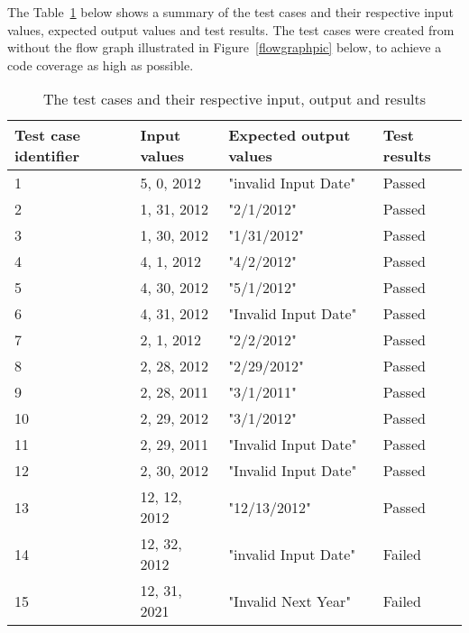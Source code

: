 \noindent The Table~\ref{testinputtable} below shows a summary of the test cases and their respective input values, expected output values and test results. The test cases were created from without the flow graph illustrated in Figure~\ref{flowgraphpic} below, to achieve a code coverage as high as possible.  

\begin{table}[!htb]
	\centering
	\caption{The test cases and their respective input, output and results}
	\label{testinputtable}	
    \begin{tabular}{|l|l|l|l|}
        \hline
        Test case identifier & Input values & Expected output values &  Test results \\ \hline
        1                    & 5, 0, 2012   & "invalid Input Date"   &  Passed       \\ 
        2                    & 1, 31, 2012  & "2/1/2012"             &  Passed       \\ 
        3                    & 1, 30, 2012  & "1/31/2012"            &  Passed       \\ 
        4                    & 4, 1, 2012   & "4/2/2012"             &  Passed       \\ 
        5                    & 4, 30, 2012  & "5/1/2012"             &  Passed       \\ 
        6                    & 4, 31, 2012  & "Invalid Input Date"   &  Passed       \\ 
        7                    & 2, 1, 2012   & "2/2/2012"             &  Passed       \\ 
        8                    & 2, 28, 2012  & "2/29/2012"            &  Passed       \\ 
        9                    & 2, 28, 2011  & "3/1/2011"             &  Passed       \\ 
        10                   & 2, 29, 2012  & "3/1/2012"             &  Passed       \\ 
        11                   & 2, 29, 2011  & "Invalid Input Date"   &  Passed       \\ 
        12                   & 2, 30, 2012  & "Invalid Input Date"   &  Passed       \\ 
        13                   & 12, 12, 2012 & "12/13/2012"           &  Passed       \\ 
        14                   & 12, 32, 2012 & "invalid Input Date"   &  Failed       \\ 
        15                   & 12, 31, 2021 & "Invalid Next Year"    &  Failed       \\ 

\end{tabular}
\end{table}
